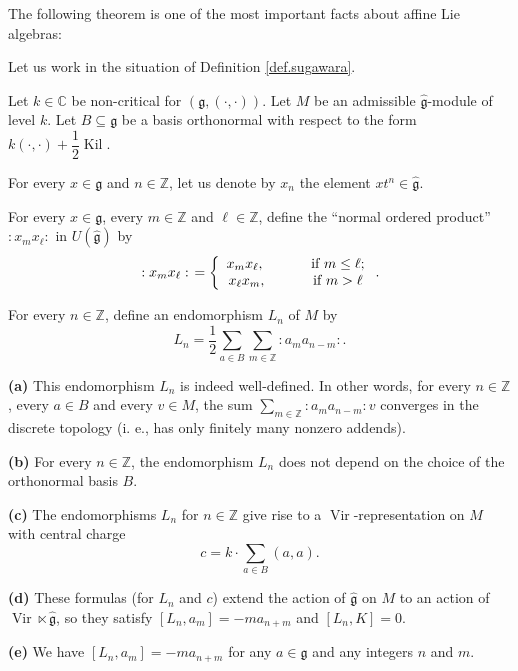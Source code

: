 \documentclass[etingof-lie.tex]{subfiles}
\begin{document}
The following theorem is one of the most important facts about affine Lie algebras:

\begin{theorem}
\label{thm.sugawara}Let us work in the situation of
Definition \ref{def.sugawara}.

Let $k\in\mathbb{C}$ be non-critical for $\left(  \mathfrak{g},\left(
\cdot,\cdot\right)  \right)  $. Let $M$ be an admissible
$\widehat{\mathfrak{g}}$-module of level $k$. Let $B\subseteq\mathfrak{g}$ be
a basis orthonormal with respect to the form $k\left(  \cdot,\cdot\right)
+\dfrac{1}{2}\operatorname*{Kil}$.

For every $x\in\mathfrak{g}$ and $n\in\mathbb{Z}$, let us denote by $x_{n}$
the element $xt^{n}\in\widehat{\mathfrak{g}}$.

For every $x\in\mathfrak{g}$, every $m\in\mathbb{Z}$ and $\ell\in\mathbb{Z}$,
define the ``normal ordered product'' $\left.  :x_{m}x_{\ell}:\right.  $ in
$U\left(  \widehat{\mathfrak{g}}\right)  $ by%
\[
\left.  :x_{m}x_{\ell}:\right.  =\left\{
\begin{array}
[c]{c}%
x_{m}x_{\ell},\ \ \ \ \ \ \ \ \ \ \text{if }m\leq\ell;\\
x_{\ell}x_{m},\ \ \ \ \ \ \ \ \ \ \text{if }m>\ell
\end{array}
\right.  .
\]


For every $n\in\mathbb{Z}$, define an endomorphism $L_{n}$ of $M$ by%
\[
L_{n}=\dfrac{1}{2}\sum\limits_{a\in B}\sum\limits_{m\in\mathbb{Z}}\left.
:a_{m}a_{n-m}:\right.  .
\]


\textbf{(a)} This endomorphism $L_{n}$ is indeed well-defined. In other words,
for every $n\in\mathbb{Z}$, every $a\in B$ and every $v\in M$, the sum
$\sum\limits_{m\in\mathbb{Z}}\left.  :a_{m}a_{n-m}:\right.  v$ converges in
the discrete topology (i. e., has only finitely many nonzero addends).

\textbf{(b)} For every $n\in\mathbb{Z}$, the endomorphism $L_{n}$ does not
depend on the choice of the orthonormal basis $B$.

\textbf{(c)} The endomorphisms $L_{n}$ for $n\in\mathbb{Z}$ give rise to a
$\operatorname*{Vir}$-representation on $M$ with central charge%
\[
c=k\cdot\sum\limits_{a\in B}\left(  a,a\right)  .
\]


\textbf{(d)} These formulas (for $L_{n}$ and $c$) extend the action of
$\widehat{\mathfrak{g}}$ on $M$ to an action of $\operatorname*{Vir}%
\ltimes\widehat{\mathfrak{g}}$, so they satisfy $\left[  L_{n},a_{m}\right]
=-ma_{n+m}$ and $\left[  L_{n},K\right]  =0$.

\textbf{(e)} We have $\left[  L_{n},a_{m}\right]  =-ma_{n+m}$ for any
$a\in\mathfrak{g}$ and any integers $n$ and $m$.
\end{theorem}
\end{document}

